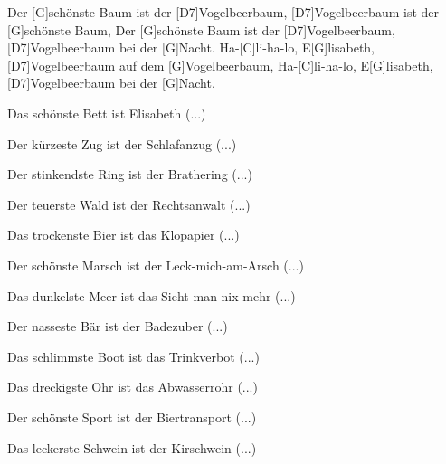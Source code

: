 

\begin{guitar}
	Der [G]schönste Baum ist der [D7]Vogelbeerbaum,
	[D7]Vogelbeerbaum ist der [G]schönste Baum,
	Der [G]schönste Baum ist der [D7]Vogelbeerbaum,
	[D7]Vogelbeerbaum bei der [G]Nacht.
	Ha-[C]li-ha-lo, E[G]lisabeth,
	[D7]Vogelbeerbaum auf dem [G]Vogelbeerbaum,
	Ha-[C]li-ha-lo, E[G]lisabeth,
	[D7]Vogelbeerbaum bei der [G]Nacht.
	
	Das schönste Bett ist Elisabeth (...)
	
	Der kürzeste Zug ist der Schlafanzug (...)
	
	Der stinkendste Ring ist der Brathering (...)
	
	Der teuerste Wald ist der Rechtsanwalt (...)
	
	Das trockenste Bier ist das Klopapier (...)
	
	Der schönste Marsch ist der Leck-mich-am-Arsch (...)
	
	Das dunkelste Meer ist das Sieht-man-nix-mehr (...)
	
	Der nasseste Bär ist der Badezuber (...)
	
	Das schlimmste Boot ist das Trinkverbot (...)
	
	Das dreckigste Ohr ist das Abwasserrohr (...)
	
	Der schönste Sport ist der Biertransport (...)
	
	Das leckerste Schwein ist der Kirschwein (...)
	
\end{guitar}